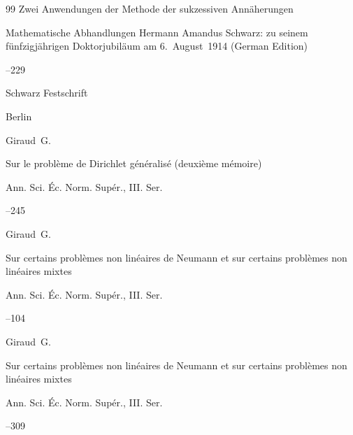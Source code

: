\begin{thebibliography}{99}
\paper Zwei Anwendungen der Methode der sukzessiven Ann\"aherungen

\inbook Mathematische Abhandlungen Hermann Amandus Schwarz: zu seinem f\"unfzigj\"ahrigen Doktorjubil\"aum am 6.~August~1914 (German Edition)


--229

\publ Schwarz Festschrift

\publaddr Berlin





\by Giraud~G.

\paper Sur le probl\`eme de Dirichlet g\'en\'eralis\'e (deuxi\`eme m\'emoire)

\jour Ann. Sci. \'Ec. Norm. Sup\'er.\rm, III. Ser.



--245






\by Giraud~G.

\paper Sur certains probl\`emes non lin\'eaires de Neumann et sur certains probl\`emes non lin\'eaires mixtes

\jour Ann. Sci. \'Ec. Norm. Sup\'er.\rm, III. Ser.



--104






\by Giraud~G.

\paper Sur certains probl\`emes non lin\'eaires de Neumann et sur certains probl\`emes non lin\'eaires mixtes

\jour Ann. Sci. \'Ec. Norm. Sup\'er.\rm, III. Ser.



--309


\end{thebibliography}
